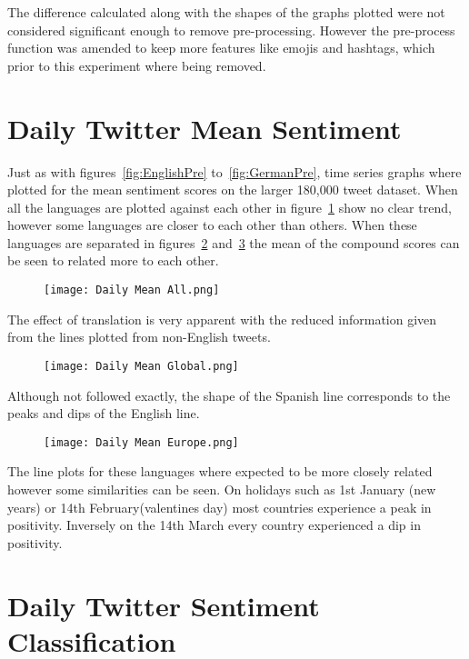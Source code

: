 \noindent The difference calculated along with the shapes of the graphs plotted were not considered significant enough to remove pre-processing.
However the pre-process function was amended to keep more features like emojis and hashtags, which prior to this experiment where being removed.

\section{Daily Twitter Mean Sentiment}

Just as with figures~\ref{fig:EnglishPre} to~\ref{fig:GermanPre}, time series graphs where plotted for the mean sentiment scores on the larger 180,000 tweet dataset.
When all the languages are plotted against each other in figure~\ref{fig:globalall} show no clear trend, however some languages are closer to each other than others.
When these languages are separated in figures~\ref{fig:globalmean} and~\ref{fig:globaleu} the mean of the compound scores can be seen to related more to each other.

\begin{figure}[h!]
\texttt{[image: Daily Mean All.png]}
\caption[Daily Mean All]{ }
\label{fig:globalall}
\end{figure}

\noindent The effect of translation is very apparent with the reduced information given from the lines plotted from non-English tweets.

\begin{figure}[h!]
\texttt{[image: Daily Mean Global.png]}
\caption[Daily Mean Global]{ }
\label{fig:globalmean}
\end{figure}

\noindent Although not followed exactly, the shape of the Spanish line corresponds to the peaks and dips of the English line.

\begin{figure}[h!]
\texttt{[image: Daily Mean Europe.png]}
\caption[Daily Mean Europe]{ }
\label{fig:globaleu}
\end{figure}

\noindent The line plots for these languages where expected to be more closely related however some similarities can be seen.
On holidays such as 1st January (new years) or 14th February(valentines day) most countries experience a peak in positivity.
Inversely on the 14th March every country experienced a dip in positivity.

\section{Daily Twitter Sentiment Classification}



